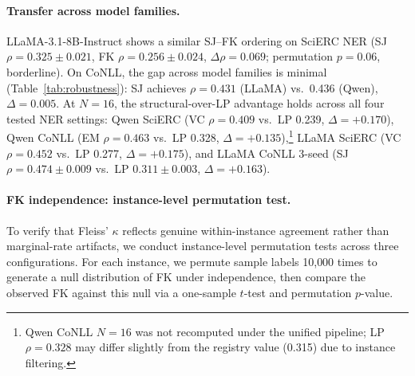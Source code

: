 \paragraph{Transfer across model families.}
LLaMA-3.1-8B-Instruct shows a similar SJ--FK ordering on SciERC NER (SJ $\rho{=}0.325{\pm}0.021$, FK $\rho{=}0.256{\pm}0.024$, $\Delta\rho{=}0.069$; permutation $p{=}0.06$, borderline).
On CoNLL, the gap across model families is minimal (Table~\ref{tab:robustness}): SJ achieves $\rho{=}0.431$ (LLaMA) vs.\ 0.436 (Qwen), $\Delta{=}0.005$.
At $N{=}16$, the structural-over-LP advantage holds across all four tested NER settings: Qwen SciERC (VC $\rho{=}0.409$ vs.\ LP 0.239, $\Delta{=}{+}0.170$), Qwen CoNLL (EM $\rho{=}0.463$ vs.\ LP 0.328, $\Delta{=}{+}0.135$),\footnote{Qwen CoNLL $N{=}16$ was not recomputed under the unified pipeline; LP $\rho{=}0.328$ may differ slightly from the registry value (0.315) due to instance filtering.} LLaMA SciERC (VC $\rho{=}0.452$ vs.\ LP 0.277, $\Delta{=}{+}0.175$), and LLaMA CoNLL 3-seed (SJ $\rho{=}0.474{\pm}0.009$ vs.\ LP $0.311{\pm}0.003$, $\Delta{=}{+}0.163$).

\paragraph{FK independence: instance-level permutation test.}\label{app:fk_independence}

To verify that Fleiss' $\kappa$ reflects genuine within-instance agreement rather than marginal-rate artifacts, we conduct instance-level permutation tests across three configurations.
For each instance, we permute sample labels 10{,}000 times to generate a null distribution of FK under independence, then compare the observed FK against this null via a one-sample $t$-test and permutation $p$-value.

\begin{table}[t]
\centering
\small
\caption{Instance-level FK independence test. Permutation tests confirm FK reflects true within-instance agreement (all $p{<}0.001$). Split-half reliability $r$ computed by randomly partitioning $N$ samples into two halves and correlating their FK scores.}
\label{tab:fk_independence}
\end{table}

